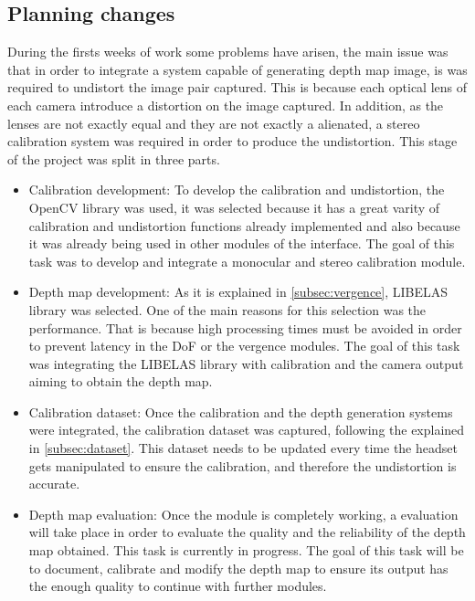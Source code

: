 \documentclass[10pt,a4paper,twocolumn,twoside]{article}
\begin{document}
	\subsection{Planning changes}
		
	During the firsts weeks of work some problems have arisen, the main issue was that in order to integrate a system capable of generating depth map image, is was required to undistort the image pair captured. This is because each optical lens of each camera introduce a distortion on the image captured. In addition, as the lenses are not exactly equal and they are not exactly a alienated, a stereo calibration system was required in order to produce the undistortion. This stage of the project was split in three parts.
	
	\begin{itemize}
		\item Calibration development: To develop the calibration and undistortion, the OpenCV library \cite{web:opencv} was used, it was selected because it has a great varity of calibration and undistortion functions already implemented and also because it was already being used in other modules of the interface. The goal of this task was to develop and integrate a monocular and stereo calibration module.
		
		\item Depth map development: As it is explained in \ref{subsec:vergence}, LIBELAS library was selected. One of the main reasons for this selection was the performance. That is because high processing times must be avoided in order to prevent latency in the DoF or the vergence modules. The goal of this task was integrating the LIBELAS library with calibration and the camera output aiming to obtain the depth map. 
		
		\item Calibration dataset: Once the calibration and the depth generation systems were integrated, the calibration dataset was captured, following the explained in \ref{subsec:dataset}. This dataset needs to be updated every time the headset gets manipulated to ensure the calibration, and therefore the undistortion is accurate.
		
		\item Depth map evaluation: Once the module is completely working, a evaluation will take place in order to evaluate the quality and the reliability of the depth map obtained. This task is currently in progress. The goal of this task will be to document, calibrate and modify the depth map to ensure its output has the enough quality to continue with further modules.
	\end{itemize}
\end{document}
